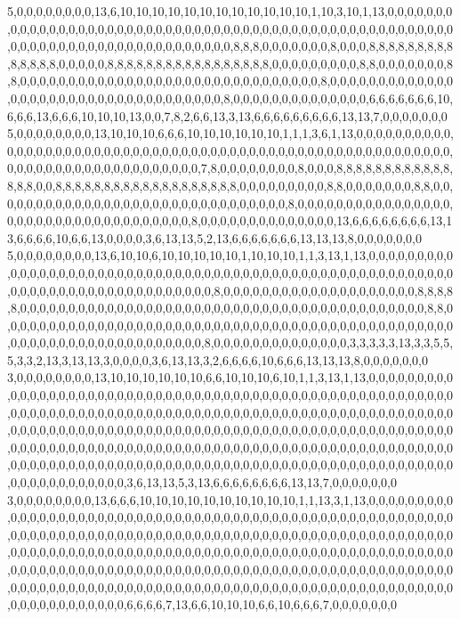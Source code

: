 5,0,0,0,0,0,0,0,0,13,6,10,10,10,10,10,10,10,10,10,10,10,10,1,10,3,10,1,13,0,0,0,0,0,0,0,0,0,0,0,0,0,0,0,0,0,0,0,0,0,0,0,0,0,0,0,0,0,0,0,0,0,0,0,0,0,0,0,0,0,0,0,0,0,0,0,0,0,0,0,0,0,0,0,0,0,0,0,0,0,0,0,0,0,0,0,0,0,0,0,0,0,0,0,0,8,8,8,0,0,0,0,0,0,0,8,0,0,0,8,8,8,8,8,8,8,8,8,8,8,8,8,8,0,0,0,0,0,8,8,8,8,8,8,8,8,8,8,8,8,8,8,8,8,8,0,0,0,0,0,0,0,0,0,8,8,0,0,0,0,0,0,0,8,8,0,0,0,0,0,0,0,0,0,0,0,0,0,0,0,0,0,0,0,0,0,0,0,0,0,0,0,0,0,0,0,8,0,0,0,0,0,0,0,0,0,0,0,0,0,0,0,0,0,0,0,0,0,0,0,0,0,0,0,0,0,0,0,0,0,0,0,8,0,0,0,0,0,0,0,0,0,0,0,0,0,0,6,6,6,6,6,6,6,10,6,6,6,13,6,6,6,10,10,10,13,0,0,7,8,2,6,6,13,3,13,6,6,6,6,6,6,6,6,6,13,13,7,0,0,0,0,0,0,0
5,0,0,0,0,0,0,0,0,13,10,10,10,6,6,6,10,10,10,10,10,10,1,1,1,3,6,1,13,0,0,0,0,0,0,0,0,0,0,0,0,0,0,0,0,0,0,0,0,0,0,0,0,0,0,0,0,0,0,0,0,0,0,0,0,0,0,0,0,0,0,0,0,0,0,0,0,0,0,0,0,0,0,0,0,0,0,0,0,0,0,0,0,0,0,0,0,0,0,0,0,0,0,0,0,7,8,0,0,0,0,0,0,0,0,8,0,0,0,8,8,8,8,8,8,8,8,8,8,8,8,8,8,8,0,0,8,8,8,8,8,8,8,8,8,8,8,8,8,8,8,8,8,8,8,0,0,0,0,0,0,0,0,0,8,8,0,0,0,0,0,0,0,8,8,0,0,0,0,0,0,0,0,0,0,0,0,0,0,0,0,0,0,0,0,0,0,0,0,0,0,0,0,0,0,0,8,0,0,0,0,0,0,0,0,0,0,0,0,0,0,0,0,0,0,0,0,0,0,0,0,0,0,0,0,0,0,0,0,0,0,0,8,0,0,0,0,0,0,0,0,0,0,0,0,0,0,13,6,6,6,6,6,6,6,6,13,13,6,6,6,6,10,6,6,13,0,0,0,0,3,6,13,13,5,2,13,6,6,6,6,6,6,6,13,13,13,8,0,0,0,0,0,0,0
5,0,0,0,0,0,0,0,0,13,6,10,10,6,10,10,10,10,10,1,10,10,10,1,1,3,13,1,13,0,0,0,0,0,0,0,0,0,0,0,0,0,0,0,0,0,0,0,0,0,0,0,0,0,0,0,0,0,0,0,0,0,0,0,0,0,0,0,0,0,0,0,0,0,0,0,0,0,0,0,0,0,0,0,0,0,0,0,0,0,0,0,0,0,0,0,0,0,0,0,0,0,0,0,0,8,0,0,0,0,0,0,0,0,0,0,0,0,0,0,0,0,0,0,0,0,8,8,8,8,8,0,0,0,0,0,0,0,0,0,0,0,0,0,0,0,0,0,0,0,0,0,0,0,0,0,0,0,0,0,0,0,0,0,0,0,0,0,0,0,0,0,0,8,8,0,0,0,0,0,0,0,0,0,0,0,0,0,0,0,0,0,0,0,0,0,0,0,0,0,0,0,0,0,0,0,0,0,0,0,0,0,0,0,0,0,0,0,0,0,0,0,0,0,0,0,0,0,0,0,0,0,0,0,0,0,0,0,0,0,0,0,8,0,0,0,0,0,0,0,0,0,0,0,0,0,0,3,3,3,3,3,13,3,3,5,5,5,3,3,2,13,3,13,13,3,0,0,0,0,3,6,13,13,3,2,6,6,6,6,10,6,6,6,13,13,13,8,0,0,0,0,0,0,0
3,0,0,0,0,0,0,0,0,13,10,10,10,10,10,10,6,6,10,10,10,6,10,1,1,3,13,1,13,0,0,0,0,0,0,0,0,0,0,0,0,0,0,0,0,0,0,0,0,0,0,0,0,0,0,0,0,0,0,0,0,0,0,0,0,0,0,0,0,0,0,0,0,0,0,0,0,0,0,0,0,0,0,0,0,0,0,0,0,0,0,0,0,0,0,0,0,0,0,0,0,0,0,0,0,0,0,0,0,0,0,0,0,0,0,0,0,0,0,0,0,0,0,0,0,0,0,0,0,0,0,0,0,0,0,0,0,0,0,0,0,0,0,0,0,0,0,0,0,0,0,0,0,0,0,0,0,0,0,0,0,0,0,0,0,0,0,0,0,0,0,0,0,0,0,0,0,0,0,0,0,0,0,0,0,0,0,0,0,0,0,0,0,0,0,0,0,0,0,0,0,0,0,0,0,0,0,0,0,0,0,0,0,0,0,0,0,0,0,0,0,0,0,0,0,0,0,0,0,0,0,0,0,0,0,0,0,0,0,0,0,0,0,0,0,0,0,0,0,0,0,0,0,0,0,0,0,0,0,0,0,0,0,0,0,0,0,0,0,0,0,0,0,0,0,0,0,0,0,0,3,6,13,13,5,3,13,6,6,6,6,6,6,6,6,13,13,7,0,0,0,0,0,0,0
3,0,0,0,0,0,0,0,0,13,6,6,6,10,10,10,10,10,10,10,10,10,10,1,1,13,3,1,13,0,0,0,0,0,0,0,0,0,0,0,0,0,0,0,0,0,0,0,0,0,0,0,0,0,0,0,0,0,0,0,0,0,0,0,0,0,0,0,0,0,0,0,0,0,0,0,0,0,0,0,0,0,0,0,0,0,0,0,0,0,0,0,0,0,0,0,0,0,0,0,0,0,0,0,0,0,0,0,0,0,0,0,0,0,0,0,0,0,0,0,0,0,0,0,0,0,0,0,0,0,0,0,0,0,0,0,0,0,0,0,0,0,0,0,0,0,0,0,0,0,0,0,0,0,0,0,0,0,0,0,0,0,0,0,0,0,0,0,0,0,0,0,0,0,0,0,0,0,0,0,0,0,0,0,0,0,0,0,0,0,0,0,0,0,0,0,0,0,0,0,0,0,0,0,0,0,0,0,0,0,0,0,0,0,0,0,0,0,0,0,0,0,0,0,0,0,0,0,0,0,0,0,0,0,0,0,0,0,0,0,0,0,0,0,0,0,0,0,0,0,0,0,0,0,0,0,0,0,0,0,0,0,0,0,0,0,0,0,0,0,0,0,0,0,0,0,0,0,0,0,6,6,6,6,7,13,6,6,10,10,10,6,6,10,6,6,6,7,0,0,0,0,0,0,0
